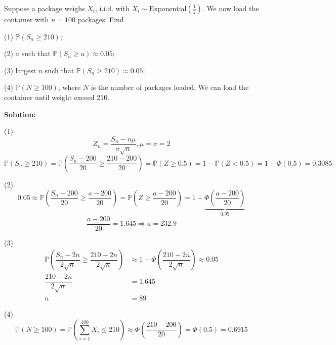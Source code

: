 \begin{eg}
    Suppose a package weighs \(X_i\), i.i.d. with \(X_i \sim \text{Exponential}\left(\frac{1}{2}\right)\). We now load the container with \(n = 100\) packages. Find 
    
    (1) \(\mathbb{P}(S_n \geq 210)\);
    
    (2) \(a\) such that \(\mathbb{P}(S_n \geq a) \approx 0.05\); 

    (3) largest \(n\) such that \(\mathbb{P}(S_n \geq 210) \approx 0.05\); 

    (4) \(\mathbb{P}(N \geq 100)\), where \(N\) is the number of packages loaded. We can load the container until weight exceed 210. 

    \textbf{Solution:} 

    (1)
    \[
        Z_n = \dfrac{S_n - n\mu}{\sigma\sqrt{n}}, \mu = \sigma = 2
    \]
    \[
        \mathbb{P}(S_n \geq 210) = \mathbb{P}(\dfrac{S_n - 200}{20} \geq \dfrac{210 - 200}{20}) = \mathbb{P}(Z \geq 0.5) = 1 - \mathbb{P}(Z < 0.5) = 1 - \varPhi (0.5) = 0.3085
    \]

    (2) 
    \[
        0.05 \approx \mathbb{P}(\dfrac{S_n - 200}{20} \geq \dfrac{a - 200}{20}) = \mathbb{P}(Z \geq \dfrac{a - 200}{20}) = 1 - \underbrace{\varPhi(\dfrac{a - 200}{20})}_{0.95}
    \]
    \[
        \dfrac{a - 200}{20} = 1.645 \Longrightarrow a = 232.9
    \]

    (3)
    \[
        \begin{aligned}
            \mathbb{P}(\dfrac{S_n - 2n}{2\sqrt{n}} \geq \dfrac{210 - 2n}{2\sqrt{n}}) &\approx 1 - \varPhi(\dfrac{210 - 2n}{2\sqrt{n}}) \approx 0.05 \\
            \dfrac{210 - 2n}{2\sqrt{n}} &= 1.645 \\
            n &= 89
        \end{aligned}
    \]

    (4)
    \[
        \mathbb{P}(N \geq 100) = \mathbb{P}\left(\sum_{i = 1}^{100} X_i \leq 210\right) \approx \varPhi\left(\dfrac{210 - 200}{20}\right) = \varPhi(0.5) = 0.6915
    \]

\end{eg}